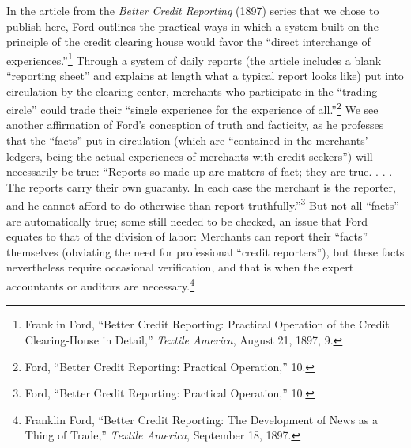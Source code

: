 \documentclass[openany,nobib]{tufte-book}
\begin{document}
In the article from the \emph{Better Credit Reporting} (1897) series
that we chose to publish here, Ford outlines the practical ways in which
a system built on the principle of the credit clearing house would favor
the ``direct interchange of experiences.''\footnote{Franklin Ford,
  ``Better Credit Reporting: Practical Operation of the Credit
  Clearing-House in Detail,'' \emph{Textile America}, August 21, 1897,
  9.} Through a system of daily reports (the article includes a blank
``reporting sheet'' and explains at length what a typical report looks
like) put into circulation by the clearing center, merchants who
participate in the ``trading circle'' could trade their ``single
experience for the experience of all.''\footnote{Ford, ``Better Credit
  Reporting: Practical Operation,'' 10.} We see another affirmation of
Ford's conception of truth and facticity, as he professes that the
``facts'' put in circulation (which are ``contained in the merchants'
ledgers, being the actual experiences of merchants with credit
seekers'') will necessarily be true: ``Reports so made up are matters of
fact; they are true. . . . The reports carry their own guaranty. In each
case the merchant is the reporter, and he cannot afford to do otherwise
than report truthfully.''\footnote{Ford, ``Better Credit Reporting:
  Practical Operation,'' 10.} But not all ``facts'' are automatically
true; some still needed to be checked, an issue that Ford equates to
that of the division of labor: Merchants can report their ``facts''
themselves (obviating the need for professional ``credit reporters''),
but these facts nevertheless require occasional verification, and that
is when the expert accountants or auditors are necessary.\footnote{Franklin
  Ford, ``Better Credit Reporting: The Development of News as a Thing of
  Trade,'' \emph{Textile America}, September 18, 1897.}
\end{document}
